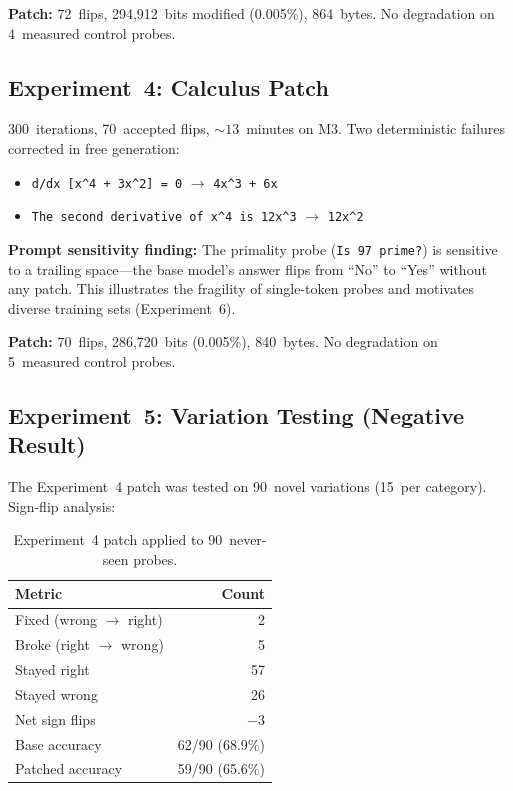 \documentclass[11pt,a4paper]{article}
\begin{document}
\textbf{Patch:} 72~flips, 294,912~bits modified (0.005\%), 864~bytes.
No degradation on 4~measured control probes.

\subsection{Experiment~4: Calculus Patch}

300~iterations, 70~accepted flips, ${\sim}13$~minutes on M3. Two
deterministic failures corrected in free generation:

\begin{itemize}[nosep]
  \item \texttt{d/dx [x\^{}4 + 3x\^{}2] = 0}
    $\to$ \texttt{4x\^{}3 + 6x} \checkmark
  \item \texttt{The second derivative of x\^{}4 is 12x\^{}3}
    $\to$ \texttt{12x\^{}2} \checkmark
\end{itemize}

\textbf{Prompt sensitivity finding:} The primality probe
(\texttt{Is 97 prime?}) is sensitive to a trailing space---the base
model's answer flips from ``No'' to ``Yes'' without any patch. This
illustrates the fragility of single-token probes and motivates
diverse training sets (Experiment~6).

\textbf{Patch:} 70~flips, 286,720~bits (0.005\%), 840~bytes.
No degradation on 5~measured control probes.

\subsection{Experiment~5: Variation Testing (Negative Result)}

The Experiment~4 patch was tested on 90~novel variations (15~per
category). Sign-flip analysis:

\begin{table}[h]
\centering
\caption{Experiment~4 patch applied to 90~never-seen probes.}
\begin{tabular}{@{}lr@{}}
\toprule
Metric & Count \\
\midrule
Fixed (wrong $\to$ right) & 2 \\
Broke (right $\to$ wrong) & 5 \\
Stayed right & 57 \\
Stayed wrong & 26 \\
\midrule
Net sign flips & $-3$ \\
Base accuracy & 62/90 (68.9\%) \\
Patched accuracy & 59/90 (65.6\%) \\
\bottomrule
\end{tabular}
\end{table}
\end{document}
